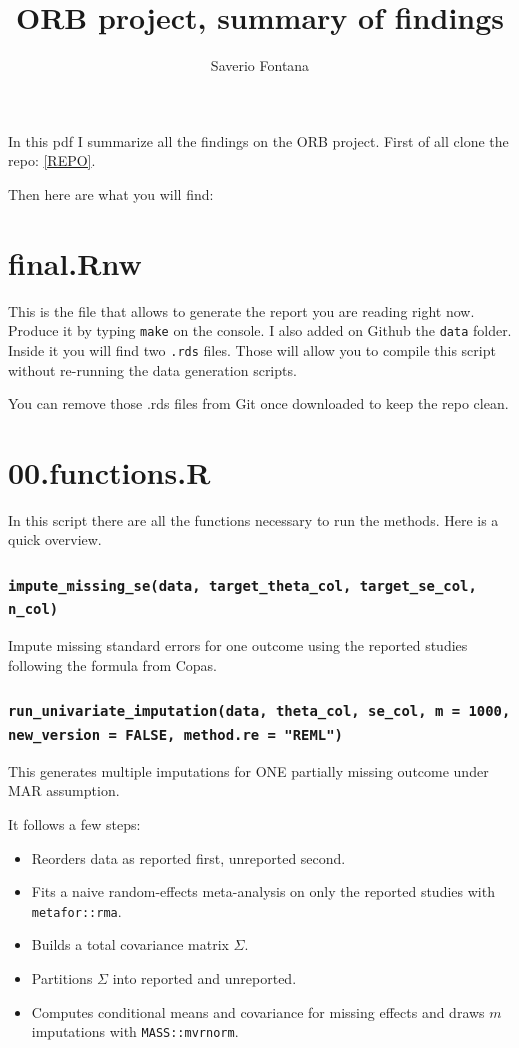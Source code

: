 \documentclass{article}\usepackage[]{graphicx}\usepackage[]{xcolor}
\title{ORB project, summary of findings }
\author{Saverio Fontana}
\begin{document}
\maketitle
In this pdf I summarize all the findings on the ORB project. First of all clone the repo: 
\href{https://github.com/SaveFonta/ORB_project}{[REPO]}. 

Then here are what you will find:




\section{final.Rnw}
This is the file that allows to generate the report you are reading right now. Produce it by typing \texttt{make} on the console. 
I also added on Github the \texttt{data} folder. Inside it you will find two \texttt{.rds} files. Those will allow you to compile this script without re-running the data generation scripts. 

You can remove those .rds files from Git once downloaded to keep the repo clean.

\section{00.functions.R}
In this script there are all the functions necessary to run the methods. Here is a quick overview.


\subsubsection{\texttt{impute\_missing\_se(data, target\_theta\_col, target\_se\_col, n\_col)}}
Impute missing standard errors for one outcome using the reported studies following the formula from Copas. 





\subsubsection{\texttt{run\_univariate\_imputation(data, theta\_col, se\_col, m = 1000, new\_version = FALSE, method.re = "REML")}}
This generates multiple imputations for ONE partially missing outcome under MAR assumption. 

It follows a few steps: 

\begin{itemize}
	\item Reorders data as reported first, unreported second.
	\item Fits a naive random-effects meta-analysis on only the reported studies with \texttt{metafor::rma}.
	\item Builds a total covariance matrix $\Sigma$.
	\item Partitions $\Sigma$ into reported and unreported.
	\item Computes conditional means and covariance for missing effects and draws $m$ imputations with
		\texttt{MASS::mvrnorm}.
\end{itemize}
\end{document}
